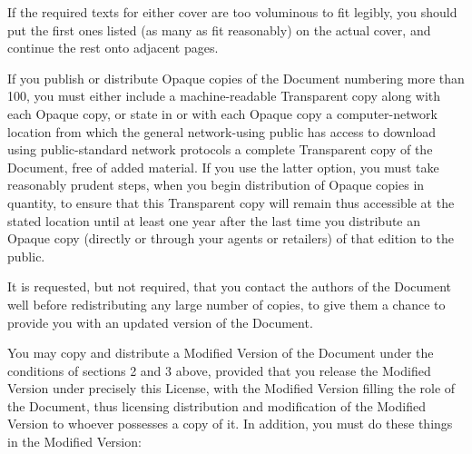 \documentclass{article}
\begin{document}
If the required texts for either cover are too voluminous to fit
legibly, you should put the first ones listed (as many as fit
reasonably) on the actual cover, and continue the rest onto adjacent
pages.

If you publish or distribute Opaque copies of the Document numbering
more than 100, you must either include a machine-readable Transparent
copy along with each Opaque copy, or state in or with each Opaque copy
a computer-network location from which the general network-using
public has access to download using public-standard network protocols
a complete Transparent copy of the Document, free of added material.
If you use the latter option, you must take reasonably prudent steps,
when you begin distribution of Opaque copies in quantity, to ensure
that this Transparent copy will remain thus accessible at the stated
location until at least one year after the last time you distribute an
Opaque copy (directly or through your agents or retailers) of that
edition to the public.

It is requested, but not required, that you contact the authors of the
Document well before redistributing any large number of copies, to give
them a chance to provide you with an updated version of the Document.



You may copy and distribute a Modified Version of the Document under
the conditions of sections 2 and 3 above, provided that you release
the Modified Version under precisely this License, with the Modified
Version filling the role of the Document, thus licensing distribution
and modification of the Modified Version to whoever possesses a copy
of it.  In addition, you must do these things in the Modified Version:
\end{document}
